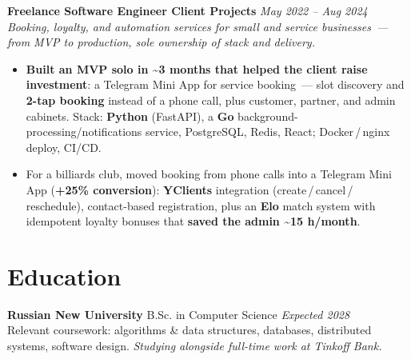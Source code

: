 \documentclass[10pt,a4paper]{article}
\begin{document}
\vspace{0.22em}
\textbf{Freelance Software Engineer \textbar{} Client Projects} \hfill \textit{May 2022 -- Aug 2024}\\[0.05em]
{\footnotesize\textit{Booking, loyalty, and automation services for small and service businesses~--- from MVP to production, sole ownership of stack and delivery.}}
\begin{itemize}
  \item \textbf{Built an MVP solo in \textasciitilde3 months that helped the client raise investment}: a Telegram Mini App for service booking~--- slot discovery and \textbf{2-tap booking} instead of a phone call, plus customer, partner, and admin cabinets. Stack: \textbf{Python} (FastAPI), a \textbf{Go} background-processing/notifications service, PostgreSQL, Redis, React; Docker\,/\,nginx deploy, CI/CD.
  \item For a billiards club, moved booking from phone calls into a Telegram Mini App (\textbf{+25\% conversion}): \textbf{YClients} integration (create\,/\,cancel\,/\,reschedule), contact-based registration, plus an \textbf{Elo} match system with idempotent loyalty bonuses that \textbf{saved the admin \textasciitilde15 h/month}.
\end{itemize}

\section*{Education}
\textbf{Russian New University} \textbar{} B.Sc. in Computer Science \textbar{} \textit{Expected 2028}\\[0.05em]
{\footnotesize Relevant coursework: algorithms \& data structures, databases, distributed systems, software design. \textit{Studying alongside full-time work at Tinkoff Bank.}}
\end{document}
